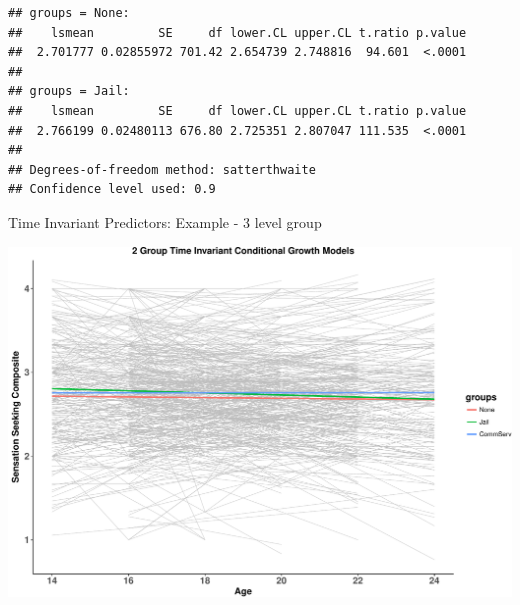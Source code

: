 \begin{frame}[fragile]

\begin{Shaded}
\begin{Highlighting}[]
\StringTok{ } \NormalTok{(}\NormalTok{,}\NormalTok{), }
          \NormalTok{, } \NormalTok{, } \NormalTok{))}
\end{Highlighting}
\end{Shaded}

\begin{verbatim}
## groups = None:
##    lsmean         SE     df lower.CL upper.CL t.ratio p.value
##  2.701777 0.02855972 701.42 2.654739 2.748816  94.601  <.0001
## 
## groups = Jail:
##    lsmean         SE     df lower.CL upper.CL t.ratio p.value
##  2.766199 0.02480113 676.80 2.725351 2.807047 111.535  <.0001
## 
## Degrees-of-freedom method: satterthwaite 
## Confidence level used: 0.9
\end{verbatim}

\end{frame}

\begin{frame}{Time Invariant Predictors: Example - 3 level group}

\includegraphics{Conditional_Models_files/figure-beamer/unnamed-chunk-38-1.pdf}

\end{frame}

